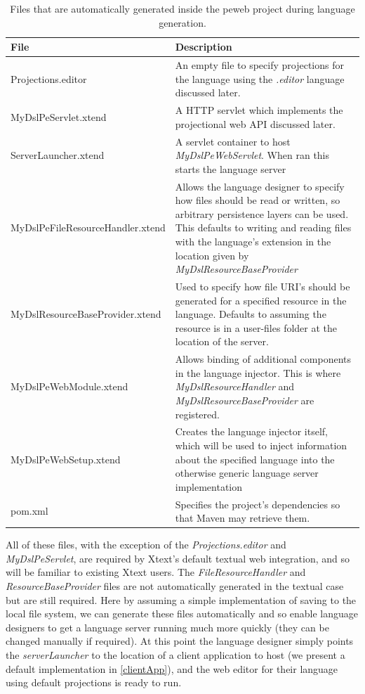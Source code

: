 \documentclass{article}
\begin{document}
\begin{table}[h!]
\centering
\begin{tabular}{| m{7cm} | m{8cm} |}
\hline
File & Description \\
\hline \hline
Projections.editor & An empty file to specify projections for the language using the \emph{.editor} language discussed later.\\
\hline
MyDslPeServlet.xtend & A HTTP servlet which implements the projectional web API discussed later.\\
\hline
ServerLauncher.xtend & A servlet container to host \emph{MyDslPeWebServlet}. When ran this starts the language server \\
\hline
MyDslPeFileResourceHandler.xtend & Allows the language designer to specify how files should be read or written, so arbitrary persistence layers can be used. This defaults to writing and reading files with the language's extension in the location given by  \emph{MyDslResourceBaseProvider} \\
\hline
MyDslResourceBaseProvider.xtend & Used to specify how file URI's should be generated for a specified resource in the language. Defaults to assuming the resource is in a user-files folder at the location of the server.\\
\hline
MyDslPeWebModule.xtend & Allows binding of additional components in the language injector. This is where \emph{MyDslResourceHandler} and \emph{MyDslResourceBaseProvider} are registered.\\
\hline
MyDslPeWebSetup.xtend & Creates the language injector itself, which will be used to inject information about the specified language into the otherwise generic language server implementation\\
\hline
pom.xml & Specifies the project's dependencies so that Maven may retrieve them.\\
\hline
\end{tabular}
\caption{Files that are automatically generated inside the peweb project during language generation.}
\label{Tab:generatedFiles}
\end{table}All of these files, with the exception of the \emph{Projections.editor} and \emph{MyDslPeServlet}, are required by Xtext's default textual web integration, and so will be familiar to existing Xtext users. The \emph{FileResourceHandler} and \emph{ResourceBaseProvider} files are not automatically generated in the textual case but are still required. Here by assuming a simple implementation of saving to the local file system, we can generate these files automatically and so enable language designers to get a language server running much more quickly (they can be changed manually if required). At this point the language designer simply points the \emph{serverLauncher} to the location of a client application to host (we present a default implementation in \ref{clientApp}), and the web editor for their language using default projections is ready to run. 
\end{document}
